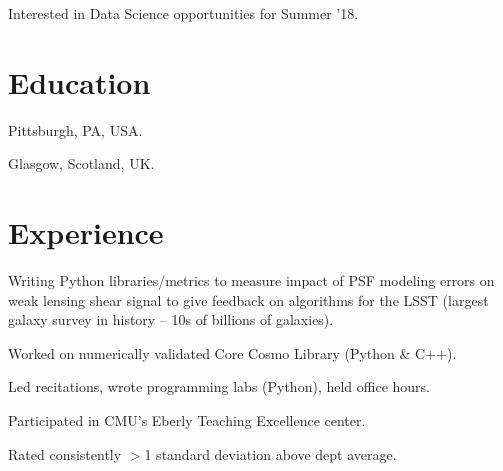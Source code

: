 \documentclass[]{deedy-resume-openfont}
\begin{document}
\hfill
\begin{minipage}[t]{0.66\textwidth} 

\vfill\vfill
$\;$
\vfill

\Large{Interested in Data Science opportunities for Summer '18.}

\section{\color{Blue} Education} 

 \hfill {}
Pittsburgh, PA, USA.
\sectionsep

 \hfill {}
Glasgow, Scotland, UK. $\;\;$  
\sectionsep


\section{\color{Blue} Experience}

 \hfill {}

\begin{tightemize} \item Writing Python libraries/metrics to measure impact of PSF modeling errors on weak lensing shear signal to give feedback on algorithms for the LSST (largest galaxy survey in history -- 10s of billions of galaxies). \item Worked on numerically validated Core Cosmo Library (Python \& C++).
\end{tightemize}
\sectionsep



\begin{tightemize}\item Led recitations, wrote programming labs (Python), held office hours.
\item Participated in CMU's Eberly Teaching Excellence center. \item Rated consistently $>$1 standard deviation above dept average.
\end{tightemize}
\sectionsep


\end{minipage}
\end{document}
